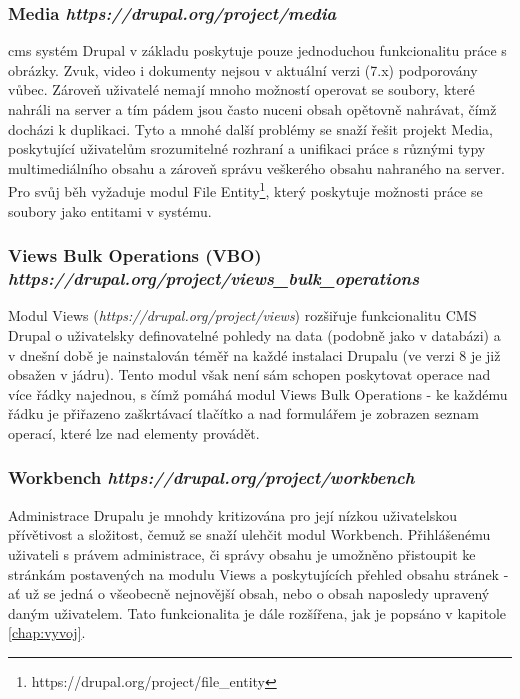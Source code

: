 \subsubsection*{Media \hfill \emph{https://drupal.org/project/media}}
\gls{cms} systém Drupal v základu poskytuje pouze jednoduchou funkcionalitu práce s obrázky. Zvuk, video i dokumenty nejsou v aktuální verzi (7.x) podporovány vůbec. Zároveň uživatelé nemají mnoho možností operovat se soubory, které nahráli na server a tím pádem jsou často nuceni obsah opětovně nahrávat, čímž docházi k duplikaci. Tyto a mnohé další problémy se snaží řešit projekt Media, poskytující uživatelům srozumitelné rozhraní a unifikaci práce s různými typy multimediálního obsahu a zároveň správu veškerého obsahu nahraného na server. Pro svůj běh vyžaduje modul File Entity\footnote{https://drupal.org/project/file\_entity}, který poskytuje možnosti práce se soubory jako entitami v systému.

\subsubsection*{Views Bulk Operations (VBO) \hfill \emph{https://drupal.org/project/views\_bulk\_operations}}
\label{subsec:vbo}
Modul Views (\emph{https://drupal.org/project/views}) rozšiřuje funkcionalitu CMS Drupal o uživatelsky definovatelné pohledy na data (podobně jako v databázi) a v dnešní době je nainstalován téměř na každé instalaci Drupalu (ve verzi 8 je již obsažen v jádru). Tento modul však není sám schopen poskytovat operace nad více řádky najednou, s čímž pomáhá modul Views Bulk Operations - ke každému řádku je přiřazeno zaškrtávací tlačítko a nad formulářem je zobrazen seznam operací, které lze nad elementy provádět.

\subsubsection*{Workbench \hfill \emph{https://drupal.org/project/workbench}}
\label{subsec:workbench}
Administrace Drupalu je mnohdy kritizována pro její nízkou uživatelskou přívětivost a složitost, čemuž se snaží ulehčit modul Workbench. Přihlášenému uživateli s právem administrace, či správy obsahu je umožněno přistoupit ke stránkám postavených na modulu Views a poskytujících přehled obsahu stránek - ať už se jedná o všeobecně nejnovější obsah, nebo o obsah naposledy upravený daným uživatelem. Tato funkcionalita je dále rozšířena, jak je popsáno v kapitole \ref{chap:vyvoj}.


